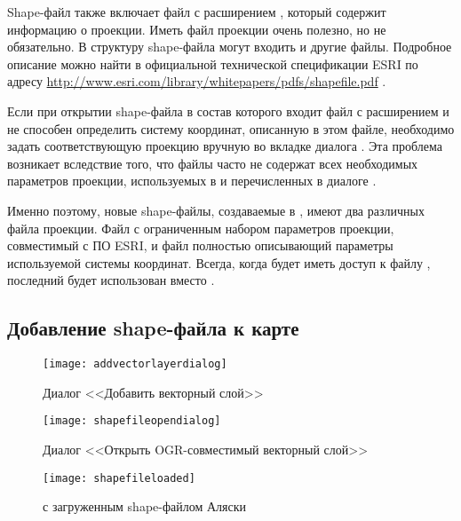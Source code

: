 Shape-файл также включает файл с расширением , который содержит
информацию о проекции. Иметь файл проекции очень полезно, но не обязательно.
В структуру shape-файла могут входить и другие файлы. Подробное описание можно найти в официальной технической
спецификации ESRI по адресу \url{http://www.esri.com/library/whitepapers/pdfs/shapefile.pdf} .


Если при открытии shape-файла в состав которого входит файл с расширением  и \qg не
способен определить систему координат, описанную в этом файле, необходимо
задать соответствующую проекцию вручную во вкладке  диалога .
Эта проблема возникает вследствие того, что файлы  часто
не содержат всех необходимых параметров проекции, используемых в \qg и перечисленных
в диалоге .

Именно поэтому, новые shape-файлы, создаваемые в \qg, имеют два различных
файла проекции. Файл  с ограниченным набором параметров проекции,
совместимый с ПО ESRI, и файл  полностью описывающий
параметры используемой системы координат. Всегда, когда \qg будет иметь доступ к файлу , последний будет
использован вместо .

\subsection{Добавление shape-файла к карте}\label{sec:load_shapefile}

\begin{figure}[ht]
   \centering
   \texttt{[image: addvectorlayerdialog]}
   \caption{Диалог <<Добавить векторный слой>> \nixcaption}\label{fig:addvectorlayer}
\end{figure}

\begin{figure}[ht]
   \centering
   \texttt{[image: shapefileopendialog]}
   \caption{Диалог <<Открыть OGR-совместимый векторный слой>> \nixcaption}\label{fig:openshapefile}
\end{figure}

\begin{figure}[ht]
   \centering
   \texttt{[image: shapefileloaded]}
   \caption{\qg с загруженным shape-файлом Аляски \nixcaption}\label{fig:loadedshapefile}
\end{figure}

